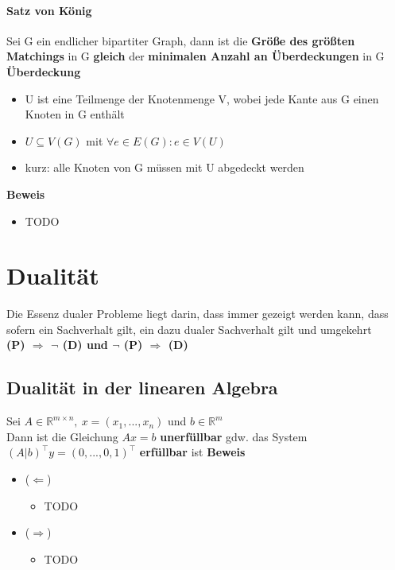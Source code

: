 \documentclass[12pt,a4paper]{article}
\begin{document}
\paragraph{Satz von König}
\flushleft
Sei G ein endlicher bipartiter Graph, dann ist die \textbf{Größe des größten Matchings} in G \textbf{gleich} der \textbf{minimalen Anzahl an Überdeckungen} in G\\

\textbf{Überdeckung}
\begin{itemize}
\item U ist eine Teilmenge der Knotenmenge V, wobei jede Kante aus G einen Knoten in G enthält
\item $U \subseteq V(G)$ mit $\forall e\in E(G) : e \in V(U)$
\item kurz: alle Knoten von G müssen mit U abgedeckt werden
\end{itemize}

\textbf{Beweis}
\begin{itemize}
\item TODO
\end{itemize}

\section{Dualität}
Die Essenz dualer Probleme liegt darin, dass immer gezeigt werden kann, dass sofern ein Sachverhalt gilt, ein dazu dualer Sachverhalt gilt und umgekehrt\\
\textbf{(P) $\Rightarrow$ $\lnot$ (D) und $\lnot$ (P) $\Rightarrow$ (D)}
\subsection{Dualität in der linearen Algebra}
Sei $A \in \mathbb{R}^{m\times n},\:x=(x_1,...,x_n)$ und $b \in \mathbb{R}^m$\\
Dann ist die Gleichung $Ax=b$ \textbf{unerfüllbar} gdw. das System\\
$(A\vert b)^{\top}y = (0,...,0,1)^\top$ \textbf{erfüllbar} ist 
\textbf{Beweis}
\begin{itemize}
\item ($\Leftarrow$)
\begin{itemize}
\item TODO
\end{itemize}
\item ($\Rightarrow$)
\begin{itemize}
\item TODO
\end{itemize}
\end{itemize}
\end{document}
